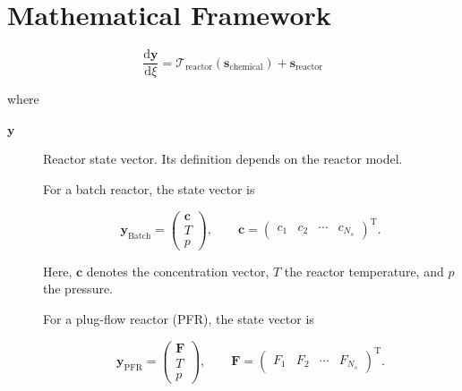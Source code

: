 \newpage

\chapter{Mathematical Framework}
\begin{equation}
    \boxed{
    \frac{\mathrm{d}\mathbf{y}}{\mathrm{d}\xi}
    =
    \mathcal{T}_{\mathrm{reactor}}
    \left(
        \mathbf{s}_{\mathrm{chemical}}
    \right)
    +
    \mathbf{s}_{\mathrm{reactor}}
    }
    \label{eq:general_state_equation}
\end{equation}

\noindent
where

\begin{description}

    \item[$\mathbf{y}$] Reactor state vector. Its definition depends on the
    reactor model.

    For a batch reactor, the state vector is

\begin{equation}
    \mathbf{y}_{\mathrm{Batch}}
    =
    \begin{pmatrix}
        \mathbf{c} \\
        T \\
        p
    \end{pmatrix},
    \qquad
    \mathbf{c}
    =
    \begin{pmatrix}
        c_1 & c_2 & \cdots & c_{N_s}
    \end{pmatrix}^{\mathrm{T}}.
\end{equation}

    Here, $\mathbf{c}$ denotes the concentration vector, $T$ the reactor
    temperature, and $p$ the pressure.

    For a plug-flow reactor (PFR), the state vector is

    \begin{equation}
        \mathbf{y}_{\mathrm{PFR}}
        =
        \begin{pmatrix}
            \mathbf{F} \\
            T \\
            p
        \end{pmatrix},
        \qquad
        \mathbf{F}
        =
        \begin{pmatrix}
            F_1 & F_2 & \cdots & F_{N_s}
        \end{pmatrix}^{\mathrm{T}}.
    \end{equation}


\end{description}
